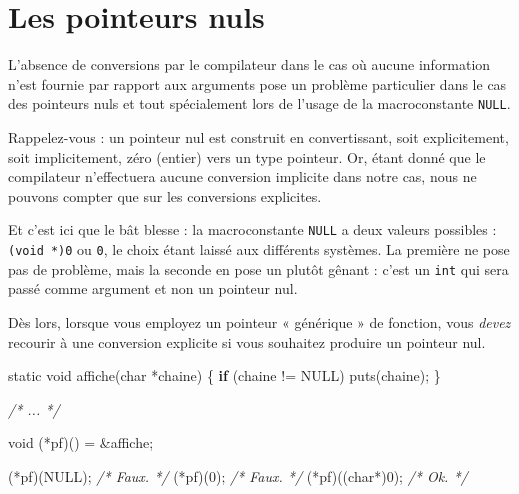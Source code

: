 \documentclass[]{article}
\newenvironment{Shaded}{}{}
\newcommand{\DataTypeTok}[1]{\textcolor[rgb]{0.56,0.13,0.00}{{#1}}}
\newcommand{\DecValTok}[1]{\textcolor[rgb]{0.25,0.63,0.44}{{#1}}}
\newcommand{\CommentTok}[1]{\textcolor[rgb]{0.38,0.63,0.69}{\textit{{#1}}}}
\newcommand{\ControlFlowTok}[1]{\textcolor[rgb]{0.00,0.44,0.13}{\textbf{{#1}}}}
\newcommand{\NormalTok}[1]{{#1}}
\begin{document}
\section{Les pointeurs nuls}\label{les-pointeurs-nuls}

L'absence de conversions par le compilateur dans le cas où aucune
information n'est fournie par rapport aux arguments pose un problème
particulier dans le cas des pointeurs nuls et tout spécialement lors de
l'usage de la macroconstante \texttt{NULL}.

Rappelez-vous : un pointeur nul est construit en convertissant, soit
explicitement, soit implicitement, zéro (entier) vers un type pointeur.
Or, étant donné que le compilateur n'effectuera aucune conversion
implicite dans notre cas, nous ne pouvons compter que sur les
conversions explicites.

Et c'est ici que le bât blesse : la macroconstante \texttt{NULL} a deux
valeurs possibles : \texttt{(void\ *)0} ou \texttt{0}, le choix étant
laissé aux différents systèmes. La première ne pose pas de problème,
mais la seconde en pose un plutôt gênant : c'est un \texttt{int} qui
sera passé comme argument et non un pointeur nul.

Dès lors, lorsque vous employez un pointeur « générique » de fonction,
vous \emph{devez} recourir à une conversion explicite si vous souhaitez
produire un pointeur nul.

\begin{Shaded}
\begin{Highlighting}[]
\DataTypeTok{static} \DataTypeTok{void} \NormalTok{affiche(}\DataTypeTok{char} \NormalTok{*chaine)}
\NormalTok{\{}
    \ControlFlowTok{if} \NormalTok{(chaine != NULL)}
        \NormalTok{puts(chaine);}
\NormalTok{\}}

\CommentTok{/* ... */}

\DataTypeTok{void} \NormalTok{(*pf)() = &affiche;}

\NormalTok{(*pf)(NULL); }\CommentTok{/* Faux. */}
\NormalTok{(*pf)(}\DecValTok{0}\NormalTok{); }\CommentTok{/* Faux. */}
\NormalTok{(*pf)((}\DataTypeTok{char}\NormalTok{*)}\DecValTok{0}\NormalTok{); }\CommentTok{/* Ok. */}
\end{Highlighting}
\end{Shaded}
\end{document}
